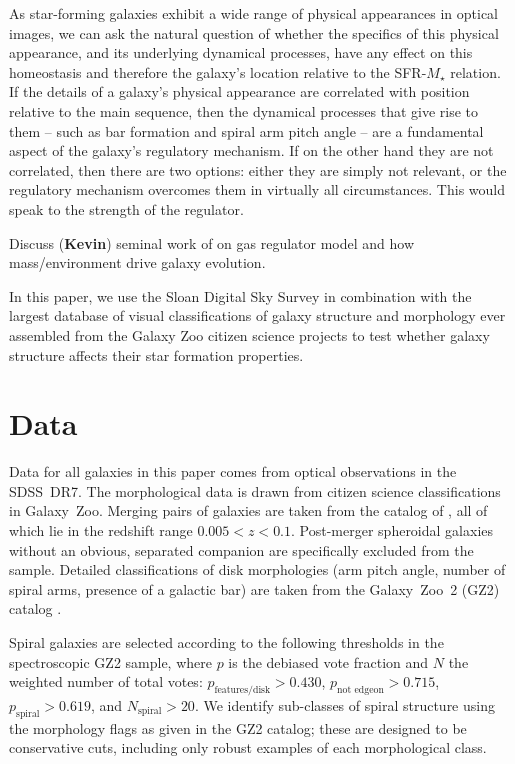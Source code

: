 \documentclass{emulateapj}
\newcommand{\kevin}{{\color{red}\textbf{Kevin}}}
\begin{document}
As star-forming galaxies exhibit a wide range of physical appearances in optical images, we can ask the natural question of whether the specifics of this physical appearance, and its underlying dynamical processes, have any effect on this homeostasis and therefore the galaxy's location relative to the SFR-$M_\star$ relation. If the details of a galaxy's physical appearance are correlated with position relative to the main sequence, then the dynamical processes that give rise to them -- such as bar formation and spiral arm pitch angle -- are a fundamental aspect of the galaxy's regulatory mechanism. If on the other hand they are not correlated, then there are two options: either they are simply not relevant, or the regulatory mechanism overcomes them in virtually all circumstances. This would speak to the strength of the regulator.

Discuss (\kevin) seminal work of \citet{pen10a,pen12,pen14a,pen14} on gas regulator model and how mass/environment drive galaxy evolution. 

In this paper, we use the Sloan Digital Sky Survey \citep{yor00,str02,aba09} in combination with the largest database of visual classifications of galaxy structure and morphology ever assembled from the Galaxy Zoo citizen science projects \citep{lin08,lin11,wil13} to test whether galaxy structure affects their star formation properties.



\section{Data} \label{sec-data}

Data for all galaxies in this paper comes from optical observations in the SDSS~DR7. The morphological data is drawn from citizen science classifications in Galaxy~Zoo. Merging pairs of galaxies are taken from the catalog of \citet{dar10a}, all of which lie in the redshift range $0.005<z<0.1$. Post-merger spheroidal galaxies without an obvious, separated companion \citep{car12} are specifically excluded from the sample. Detailed classifications of disk morphologies (arm pitch angle, number of spiral arms, presence of a galactic bar) are taken from the Galaxy~Zoo~2 (GZ2) catalog \citep{wil13}. 

Spiral galaxies are selected according to the following thresholds in the spectroscopic GZ2 sample, where $p$ is the debiased vote fraction and $N$ the weighted number of total votes: $p_\textrm{features/disk} > 0.430$, $p_\textrm{not~edgeon} > 0.715$, $p_\textrm{spiral}>0.619$, and $N_\textrm{spiral}>20$. We identify sub-classes of spiral structure using the morphology flags as given in the GZ2 catalog; these are designed to be conservative cuts, including only robust examples of each morphological class. 
\end{document}
